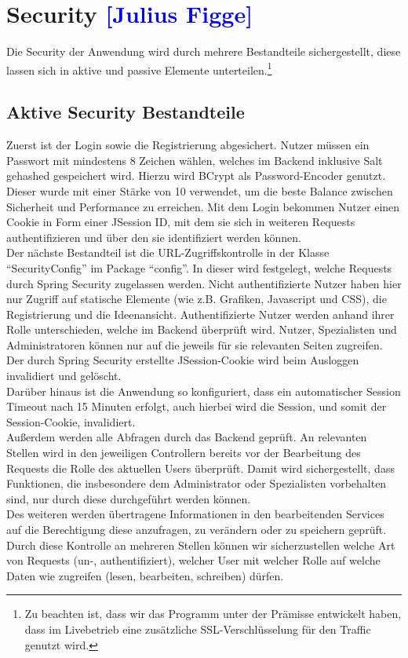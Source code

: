 

\section{Security  \textcolor{blue}{[Julius Figge]}}
\label{Security}

Die Security der Anwendung wird durch mehrere Bestandteile sichergestellt, diese lassen sich in aktive und passive Elemente unterteilen.\footnote{Zu beachten ist, dass wir das Programm unter der Prämisse entwickelt haben, dass im Livebetrieb eine zusätzliche SSL-Verschlüsselung für den Traffic genutzt wird.}

\subsection{Aktive Security Bestandteile}
Zuerst ist der Login sowie die Registrierung abgesichert. Nutzer müssen ein Passwort mit mindestens 8 Zeichen wählen, welches im Backend inklusive Salt gehashed gespeichert wird. Hierzu wird BCrypt als Password-Encoder genutzt. Dieser wurde mit einer Stärke von 10 verwendet, um die beste Balance zwischen Sicherheit und Performance zu erreichen. Mit dem Login bekommen Nutzer einen Cookie in Form einer JSession ID, mit dem sie sich in weiteren Requests authentifizieren und über den sie identifiziert werden können.\\
Der nächste Bestandteil ist die URL-Zugriffskontrolle in der Klasse \enquote{SecurityConfig} im Package \enquote{config}. In dieser wird festgelegt, welche Requests durch Spring Security zugelassen werden. Nicht authentifizierte Nutzer haben hier nur Zugriff auf statische Elemente (wie z.B. Grafiken, Javascript und CSS), die Registrierung und die Ideenansicht.
Authentifizierte Nutzer werden anhand ihrer Rolle unterschieden, welche im Backend überprüft wird. Nutzer, Spezialisten und Administratoren können nur auf die jeweils für sie relevanten Seiten zugreifen.
Der durch Spring Security erstellte JSession-Cookie wird beim Ausloggen invalidiert und gelöscht.\\
Darüber hinaus ist die Anwendung so konfiguriert, dass ein automatischer Session Timeout nach 15 Minuten erfolgt, auch hierbei wird die Session, und somit der Session-Cookie, invalidiert.\\
Außerdem werden alle Abfragen durch das Backend geprüft. An relevanten Stellen wird in den jeweiligen Controllern bereits vor der Bearbeitung des Requests die Rolle des aktuellen Users überprüft. Damit wird sichergestellt, dass Funktionen, die insbesondere dem Administrator oder Spezialisten vorbehalten sind, nur durch diese durchgeführt werden können. \\
Des weiteren werden übertragene Informationen in den bearbeitenden Services auf die Berechtigung diese anzufragen, zu verändern oder zu speichern geprüft.\\
Durch diese Kontrolle an mehreren Stellen können wir sicherzustellen welche Art von Requests (un-, authentifiziert), welcher User mit welcher Rolle auf welche Daten wie zugreifen (lesen, bearbeiten, schreiben) dürfen.\\

